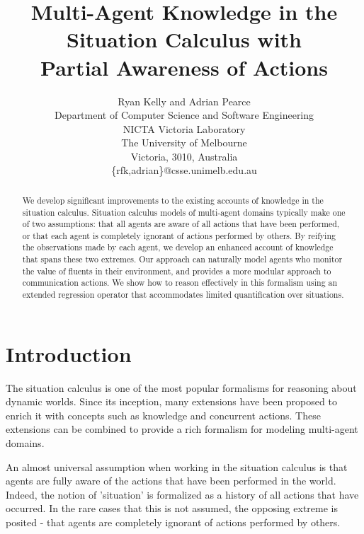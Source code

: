 \documentclass[letterpaper]{article}
\begin{document}
\title{Multi-Agent Knowledge in the Situation Calculus with\\
 Partial Awareness of Actions}


\author{Ryan Kelly and Adrian Pearce\\
 Department of Computer Science and Software Engineering\\
NICTA Victoria Laboratory\\
 The University of Melbourne\\
 Victoria, 3010, Australia\\
 \{rfk,adrian\}@csse.unimelb.edu.au}

\maketitle
\begin{abstract}
We develop significant improvements to the existing accounts of knowledge
in the situation calculus. Situation calculus models of multi-agent
domains typically make one of two assumptions: that all agents are
aware of all actions that have been performed, or that each agent
is completely ignorant of actions performed by others. By reifying
the observations made by each agent, we develop an enhanced account
of knowledge that spans these two extremes. Our approach can naturally
model agents who monitor the value of fluents in their environment,
and provides a more modular approach to communication actions. We
show how to reason effectively in this formalism using an extended
regression operator that accommodates limited quantification over
situations. 
\end{abstract}

\section{Introduction}

The situation calculus is one of the most popular formalisms for reasoning
about dynamic worlds. Since its inception, many extensions have been
proposed to enrich it with concepts such as knowledge and concurrent
actions. These extensions can be combined to provide a rich formalism
for modeling multi-agent domains.

An almost universal assumption when working in the situation calculus
is that agents are fully aware of the actions that have been performed
in the world. Indeed, the notion of 'situation' is formalized as a
history of all actions that have occurred. In the rare cases that
this is not assumed, the opposing extreme is posited - that agents
are completely ignorant of actions performed by others.
\end{document}
